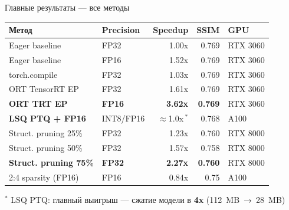 \documentclass[aspectratio=169,11pt]{beamer}
\newcommand{\hlrow}{\rowcolor{hlgreen}}
\newcommand{\hlyrow}{\rowcolor{hlyellow}}
\begin{document}
\begin{frame}{Главные результаты — все методы}
  \begin{center}
  \footnotesize
  \renewcommand{\arraystretch}{1.08}
  \begin{tabular}{@{}llrrl@{}}
    \toprule
    \textbf{Метод} & \textbf{Precision} & \textbf{Speedup} & \textbf{SSIM} & \textbf{GPU} \\
    \midrule
    Eager baseline      & FP32      & 1.00x & 0.769 & RTX 3060 \\
    Eager baseline      & FP16      & 1.52x & 0.769 & RTX 3060 \\
    torch.compile       & FP32      & 1.03x & 0.769 & RTX 3060 \\
    ORT TensorRT EP     & FP32      & 1.61x & 0.769 & RTX 3060 \\
    \hlrow
    \textbf{ORT TRT EP}   & \textbf{FP16} & \textbf{3.62x} & \textbf{0.769} & RTX 3060 \\
    \hlyrow
    \textbf{LSQ PTQ + FP16} & INT8/FP16 & $\approx$1.0x\,$^*$ & 0.768 & A100 \\
    Struct. pruning 25\% & FP32   & 1.23x & 0.760 & RTX 8000 \\
    Struct. pruning 50\% & FP32   & 1.57x & 0.758 & RTX 8000 \\
    \hlrow
    \textbf{Struct. pruning 75\%} & \textbf{FP32} & \textbf{2.27x} & \textbf{0.760} & RTX 8000 \\
    2:4 sparsity (FP16) & FP16      & 0.84x & 0.75 & A100 \\
    \bottomrule
  \end{tabular}
  \end{center}
  \vspace{0.15em}
  {\footnotesize $^*$ LSQ PTQ: главный выигрыш — сжатие модели в \textbf{4x} (112~MB~→~28~MB)}
\end{frame}
\end{document}
